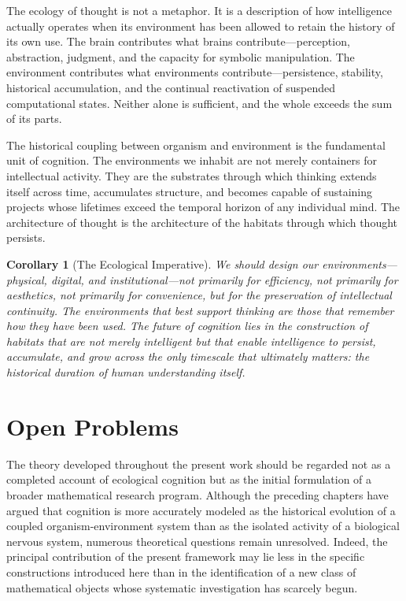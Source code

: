 \documentclass[12pt,oneside]{article}
\newtheorem{corollary}[definition]{Corollary}
\theoremstyle{remark}
\begin{document}
The ecology of thought is not a metaphor. It is a description of how intelligence actually operates when its environment has been allowed to retain the history of its own use. The brain contributes what brains contribute—perception, abstraction, judgment, and the capacity for symbolic manipulation. The environment contributes what environments contribute—persistence, stability, historical accumulation, and the continual reactivation of suspended computational states. Neither alone is sufficient, and the whole exceeds the sum of its parts.

The historical coupling between organism and environment is the fundamental unit of cognition. The environments we inhabit are not merely containers for intellectual activity. They are the substrates through which thinking extends itself across time, accumulates structure, and becomes capable of sustaining projects whose lifetimes exceed the temporal horizon of any individual mind. The architecture of thought is the architecture of the habitats through which thought persists.

\begin{corollary}[The Ecological Imperative]
We should design our environments—physical, digital, and institutional—not primarily for efficiency, not primarily for aesthetics, not primarily for convenience, but for the preservation of intellectual continuity. The environments that best support thinking are those that remember how they have been used. The future of cognition lies in the construction of habitats that are not merely intelligent but that enable intelligence to persist, accumulate, and grow across the only timescale that ultimately matters: the historical duration of human understanding itself.
\end{corollary}


\section{Open Problems}

The theory developed throughout the present work should be regarded not as a completed account of ecological cognition but as the initial formulation of a broader mathematical research program. Although the preceding chapters have argued that cognition is more accurately modeled as the historical evolution of a coupled organism-environment system than as the isolated activity of a biological nervous system, numerous theoretical questions remain unresolved. Indeed, the principal contribution of the present framework may lie less in the specific constructions introduced here than in the identification of a new class of mathematical objects whose systematic investigation has scarcely begun.
\end{document}
